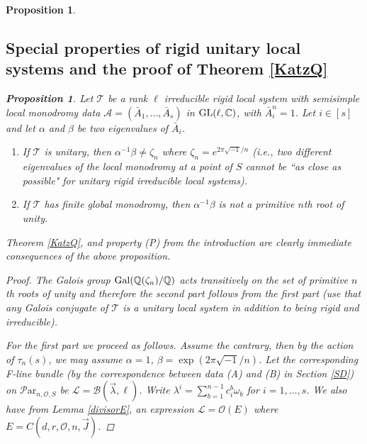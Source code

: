 \documentclass[11pt]{amsart}
\newcommand\op{\operatorname}
\newcommand\mt{\mathcal{T}}
\newcommand\ml{\mathcal{L}}
\newcommand\mb{\mathcal{B}}
\newcommand\Par{\mathcal{P}\text{ar} }
\newtheorem{proposition}[theorem]{Proposition}
\numberwithin{theorem}{subsection}
\begin{document}
{\begin{proposition}
\subsection{Special properties of rigid unitary local systems and the proof of Theorem \ref{KatzQ}} \label{KatzSection}
\begin{proposition}\label{propP}
Let $\mt$ be a rank $\ell$ irreducible rigid local system with semisimple local monodromy data
$\mathcal{A}=(\bar{A}_1,\dots,\bar{A}_s)$ in $\op{GL}(\ell,\Bbb{C})$, with $\bar{A}_i^n=1$. Let $i\in[s]$ and let $\alpha$ and $\beta$ be two eigenvalues of $\bar{A}_i$.
\begin{enumerate}
\item If $\mt$ is unitary, then $\alpha^{-1}\beta\neq \zeta_n$ where $\zeta_n=e^{2\pi\sqrt{-1}/n}$ (i.e., two different eigenvalues of the local monodromy at a point of $S$ cannot be ``as close as possible" for unitary rigid irreducible local systems).
\item If $\mt$ has finite global monodromy, then $\alpha^{-1}\beta$ is not a primitive $n$th root of unity.
\end{enumerate}
\end{proposition}
Theorem \ref{KatzQ}, and property (P) from the introduction are clearly  immediate consequences of the above proposition.
\begin{proof}
The Galois group $\op{Gal}(\Bbb{Q}(\zeta_n)/\Bbb{Q})$ acts transitively on the set of primitive $n$th roots of unity and therefore the second part follows from the first part (use that any Galois conjugate of $\mt$ is a unitary local system in addition to being rigid and irreducible).

For the first part we proceed as follows. Assume the contrary, then by the action of $\tau_n(s)$, we may assume $\alpha=1$, $\beta= \exp(2\pi \sqrt{-1}/n)$. Let the corresponding F-line bundle (by the correspondence between data  (A) and (B) in Section \ref{SD}) on $\Par_{n,\mathcal{O},S}$ be $\ml=\mb(\vec{\lambda},\ell)$. Write  $\lambda^i=\sum_{b=1}^{n-1}c^b_i\omega_b$ for $i=1,\dots,s$. We also have from Lemma \ref{divisorE}, an expression $\ml=\mathcal{O}(E)$ where  $E=C(d,r,\mathcal{O},n,\vec{J})$.


\end{proof}
\end{proposition}}
\end{document}
